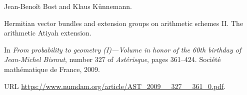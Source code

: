 Jean-Beno{\^i}t Bost and Klaus K{\"u}nnemann.

\newblock Hermitian vector bundles and extension groups on arithmetic schemes
  {II}. {The} arithmetic {Atiyah} extension.

\newblock In \emph{From probability to geometry (I)---Volume in honor of the 60th birthday of Jean-Michel Bismut}, number 327 of \emph{Ast{\'e}risque}, pages 361--424. Soci{\'e}t{\'e} math{\'e}matique de France, 2009.

\newblock URL \url{https://www.numdam.org/article/AST_2009__327__361_0.pdf}.
